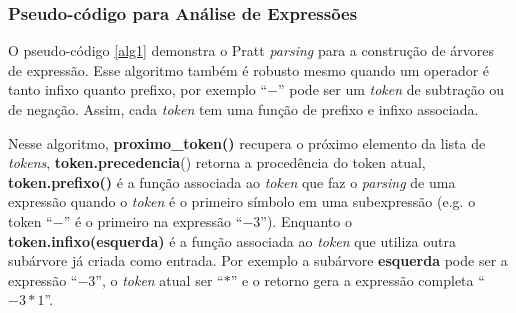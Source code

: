 \documentclass[english,
               brazil,
               bsc] %
               {dcomp-abntex2}
\begin{document}
%
%
%
%


\subsubsection{Pseudo-código para Análise de Expressões}


O pseudo-código \ref{alg1}
demonstra o Pratt \textit{parsing} para a construção de árvores de expressão. Esse algoritmo também é robusto mesmo quando um operador é tanto infixo quanto prefixo, por exemplo ``$-$'' pode ser um \textit{token} de subtração ou de negação. Assim, cada \textit{token} tem uma função de prefixo e infixo associada.


Nesse algoritmo, 
\textbf{proximo\_token()} recupera o próximo elemento da lista de \textit{tokens},
\textbf{token.precedencia}() retorna a procedência do token atual, \textbf{token.prefixo()} é a função associada ao \textit{token} que faz o \textit{parsing} de uma expressão quando o \textit{token} é o primeiro símbolo em uma subexpressão (e.g. o token ``$-$'' é o primeiro na expressão ``$-3$''). Enquanto o \textbf{token.infixo(esquerda)} é a função associada ao \textit{token} que utiliza outra subárvore já criada como entrada. Por exemplo a subárvore \textbf{esquerda} pode ser a expressão ``$-3$'', o \textit{token} atual ser ``$*$'' e o retorno gera a expressão completa ``$-3 * 1$''.
\end{document}
